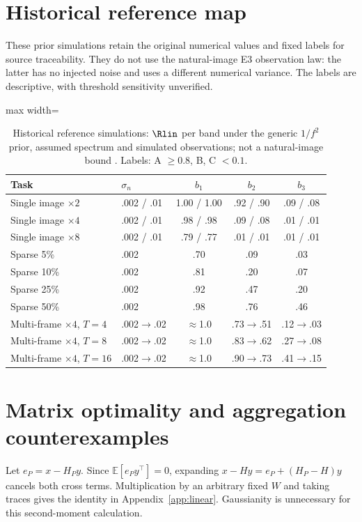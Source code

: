 \section{Historical reference map}\label{app:map}
These prior simulations retain the original numerical values and fixed labels for source traceability. They do not use the natural-image E3 observation law: the latter has no injected noise and uses a different numerical variance. The labels are descriptive, with threshold sensitivity unverified.
\begin{table}[t]\centering\small
\caption{Historical reference simulations: $\Rlin$ per band under the generic
$1/f^2$ prior, assumed spectrum and simulated observations; not a natural-image bound .
Labels: A $\ge0.8$, B, C $<0.1$.}\label{tab:map}
\begin{adjustbox}{max width=\linewidth}\begin{tabular}{llccc}\toprule
Task & $\sigma_n$ & $b_1$ & $b_2$ & $b_3$\\\midrule
Single image $\times2$ & .002 / .01 & 1.00 / 1.00 & .92 / .90 & .09 / .08\\
Single image $\times4$ & .002 / .01 & .98 / .98 & .09 / .08 & .01 / .01\\
Single image $\times8$ & .002 / .01 & .79 / .77 & .01 / .01 & .01 / .01\\
Sparse 5\% & .002 & .70 & .09 & .03\\
Sparse 10\% & .002 & .81 & .20 & .07\\
Sparse 25\% & .002 & .92 & .47 & .20\\
Sparse 50\% & .002 & .98 & .76 & .46\\
Multi-frame $\times4$, $T{=}4$ & .002$\to$.02 & $\approx$1.0 & .73$\to$.51 & .12$\to$.03\\
Multi-frame $\times4$, $T{=}8$ & .002$\to$.02 & $\approx$1.0 & .83$\to$.62 & .27$\to$.08\\
Multi-frame $\times4$, $T{=}16$ & .002$\to$.02 & $\approx$1.0 & .90$\to$.73 & .41$\to$.15\\
\bottomrule\end{tabular}\end{adjustbox}
\end{table}


\section{Matrix optimality and aggregation counterexamples}
Let $e_P=x-H_Py$. Since $\mathbb E[e_Py^\top]=0$, expanding
$x-Hy=e_P+(H_P-H)y$ cancels both cross terms. Multiplication by an arbitrary
fixed $W$ and taking traces gives the identity in Appendix~\ref{app:linear}.
Gaussianity is unnecessary for this second-moment calculation.

